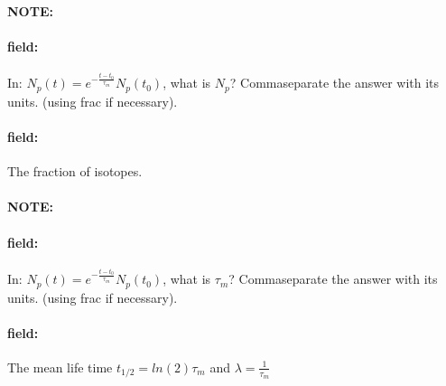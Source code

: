 \documentclass[12pt]{article}
\newenvironment{note}{\paragraph{NOTE:}}{}
\newenvironment{field}{\paragraph{field:}}{}
\begin{document}
\begin{note}
   \begin{field}
       In: \(N_p(t)=e^{-\frac{t-t_0}{\tau_m}}N_p(t_0)\),  what is \(N_p\)? Commaseparate the answer with its units. (using frac if necessary).
   \end{field}
   \begin{field}
		The fraction of isotopes.
   \end{field}
\end{note}
\begin{note}
   \begin{field}
       In: \(N_p(t)=e^{-\frac{t-t_0}{\tau_m}}N_p(t_0)\),  what is \(\tau_m\)? Commaseparate the answer with its units. (using frac if necessary).
   \end{field}
   \begin{field}
		The mean life time \(t_{1/2}=ln(2)\tau_m\) and \(\lambda=\frac{1}{\tau_m}\)
   \end{field}
\end{note}
\end{document}
